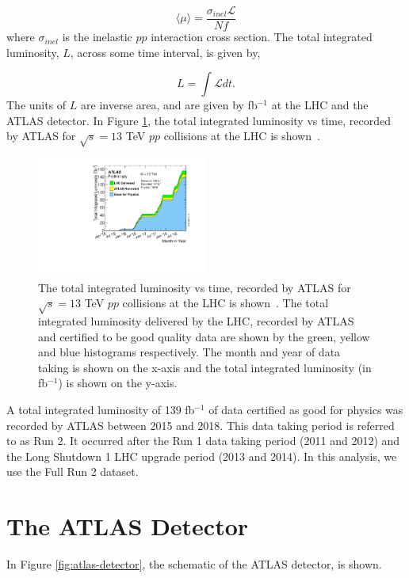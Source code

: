 \begin{equation}
\langle \mu \rangle = \frac{\sigma_{inel}\mathcal{L}}{N f}
\end{equation}
where $\sigma_{inel}$ is the inelastic $pp$ interaction cross section. The total integrated luminosity, $L$, across some time interval, is given by,

\begin{equation}
L = \int \mathcal{L} dt.
\end{equation}
The units of $L$ are inverse area, and are given by fb$^{-1}$ at the LHC and the ATLAS detector. In Figure \ref{fig:lhc-lumi}, the total integrated luminosity vs time, recorded by ATLAS for $\sqrt{s} = 13$ TeV $pp$ collisions at the LHC is shown~\cite{LHC-lumi}.

\begin{figure}[h!]
 \includegraphics[width=0.5\textwidth]{figures/theoryFigs/lhc_lumi.pdf}
 \centering
\caption{The total integrated luminosity vs time, recorded by ATLAS for $\sqrt{s} = 13$ TeV $pp$ collisions at the LHC is shown~\cite{LHC-lumi}. The total integrated luminosity delivered by the LHC, recorded by ATLAS and certified to be good quality data are shown by the green, yellow and blue histograms respectively. The month and year of data taking is shown on the x-axis and the total integrated luminosity (in fb$^{-1}$) is shown on the y-axis.}
\label{fig:lhc-lumi}
\end{figure}

A total integrated luminosity of 139 fb$^{-1}$ of data certified as good for physics was recorded by ATLAS between 2015 and 2018. This data taking period is referred to as Run 2. It occurred after the Run 1 data taking period (2011 and 2012) and the Long Shutdown 1 LHC upgrade period (2013 and 2014). In this analysis, we use the Full Run 2 dataset.


\section{The ATLAS Detector}
In Figure \ref{fig:atlas-detector}, the schematic of the ATLAS detector, is shown.

